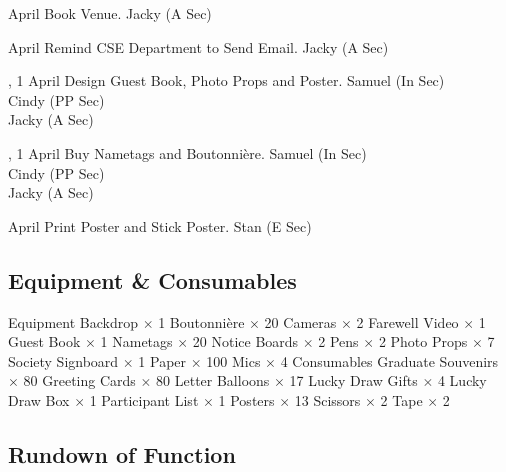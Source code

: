 \bTR{}
\eTD{} April
\eTD\bTD Book Venue.
\eTD\bTD Jacky (A Sec)
\eTD\eTR

\bTR{}
\eTD{} April
\eTD\bTD Remind CSE Department to Send Email.
\eTD\bTD Jacky (A Sec)
\eTD\eTR

\bTR{}, 1
\eTD{} April
\eTD\bTD Design Guest Book, Photo Props and Poster.
\eTD\bTD Samuel (In Sec) \\ Cindy (PP Sec) \\ Jacky (A Sec)
\eTD\eTR

\bTR{}, 1
\eTD{} April
\eTD\bTD Buy Nametags and Boutonnière.
\eTD\bTD Samuel (In Sec) \\ Cindy (PP Sec) \\ Jacky (A Sec)
\eTD\eTR

\bTR{}
\eTD{} April
\eTD\bTD Print Poster and Stick Poster.
\eTD\bTD Stan (E Sec)
\eTD\eTR

\eTABLEbody
\eTABLE

\subsection{Equipment \& Consumables}
\starttabulate[|l|l|]
\NC{}Equipment\NC\NR
\HL
\NC Backdrop            \NC $\times$ 1  \NR
\NC Boutonnière         \NC $\times$ 20 \NR
\NC Cameras             \NC $\times$ 2  \NR
\NC Farewell Video      \NC $\times$ 1  \NR
\NC Guest Book          \NC $\times$ 1  \NR
\NC Nametags            \NC $\times$ 20 \NR
\NC Notice Boards       \NC $\times$ 2  \NR
\NC Pens                \NC $\times$ 2  \NR
\NC Photo Props         \NC $\times$ 7  \NR
\NC Society Signboard   \NC $\times$ 1  \NR
\NC Paper               \NC $\times$ 100\NR
\NC Mics                \NC $\times$ 4  \NR
\HL
\NR
\NC{}Consumables\NC\NR
\HL
\NC Graduate Souvenirs  \NC $\times$ 80 \NR
\NC Greeting Cards      \NC $\times$ 80 \NR
\NC Letter Balloons     \NC $\times$ 17 \NR
\NC Lucky Draw Gifts    \NC $\times$ 4  \NR
\NC Lucky Draw Box      \NC $\times$ 1  \NR
\NC Participant List    \NC $\times$ 1  \NR
\NC Posters             \NC $\times$ 13 \NR
\NC Scissors            \NC $\times$ 2  \NR
\NC Tape                \NC $\times$ 2  \NR
\HL
\stoptabulate

\pagebreak
\subsection{Rundown of Function}

\setupTABLE[c][1][width=1.25in]
\setupTABLE[c][2][width=3.5in]
\setupTABLE[c][3][width=1.25in]
\bTABLE
\bTABLEhead

